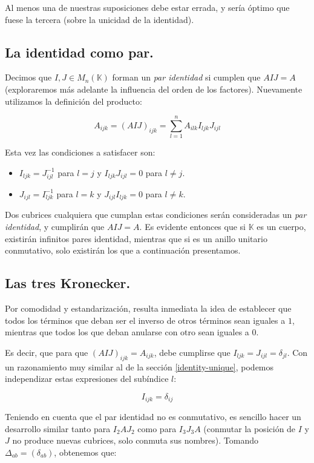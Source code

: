 Al menos una de nuestras suposiciones debe estar errada, y sería óptimo que fuese la tercera (sobre la unicidad de la identidad).

\subsection{La identidad como par.} \label{identity-pair}

Decimos que $I, J \in M_{n} (\mathbb{K})$ forman un \textit{par identidad} si cumplen que $AIJ = A$ (exploraremos más adelante la influencia del orden de los factores). Nuevamente utilizamos la definición del producto:

$$A_{ijk} = (AIJ)_{ijk} = \sum\limits_{l=1}^{n} A_{ilk} I_{ljk} J_{ijl}$$

Esta vez las condiciones a satisfacer son:

\begin{itemize}
	\item $I_{ljk} = J_{ijl}^{-1}$ para $l = j$ y $I_{ljk} J_{ijl} = 0$ para $l \neq j$.
	\item $J_{ijl} = I_{ljk}^{-1}$ para $l = k$ y $J_{ijl} I_{ljk} = 0$ para $l \neq k$.
\end{itemize}

Dos cubrices cualquiera que cumplan estas condiciones serán consideradas un \textit{par identidad}, y cumplirán que $AIJ = A$. Es evidente entonces que si $\mathbb{K}$ es un cuerpo, existirán infinitos pares identidad, mientras que si es un anillo unitario conmutativo, solo existirán los que a continuación presentamos.

\subsection{Las tres Kronecker.} \label{identity-kronecker}

Por comodidad y estandarización, resulta inmediata la idea de establecer que todos los términos que deban ser el inverso de otros términos sean iguales a $1$, mientras que todos los que deban anularse con otro sean iguales a $0$.

Es decir, que para que $(AIJ)_{ijk} = A_{ijk}$, debe cumplirse que $I_{ljk} = J_{ijl} = \delta_{jl}$. Con un razonamiento muy similar al de la sección \ref{identity-unique}, podemos independizar estas expresiones del subíndice $l$:

$$I_{ijk} = \delta_{ij}$$

Teniendo en cuenta que el par identidad no es conmutativo, es sencillo hacer un desarrollo similar tanto para $I_2 A J_2$ como para $I_3 J_3 A$ (conmutar la posición de $I$ y $J$ no produce nuevas cubrices, solo conmuta sus nombres). Tomando $\Delta_{ab} = (\delta_{ab})$, obtenemos que: %

